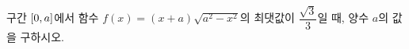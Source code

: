 구간 $[0{,}\mkern3mu\mathopen{}a]$에서 함수 $f(x)=(x+a)\sqrt{a^2-x^2}$의 최댓값이 $\dfrac{\sqrt{3}}{3}$일 때, 양수 $a$의 값을 구하시오.
